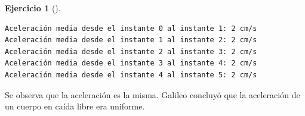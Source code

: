 \documentclass[
  a4paper,
]{scrreport}
\newenvironment{Shaded}{\begin{snugshade}}{\end{snugshade}}
\newcommand{\ControlFlowTok}[1]{\textcolor[rgb]{0.00,0.23,0.31}{\textbf{#1}}}
\newcommand{\FloatTok}[1]{\textcolor[rgb]{0.68,0.00,0.00}{#1}}
\newcommand{\FunctionTok}[1]{\textcolor[rgb]{0.28,0.35,0.67}{#1}}
\newcommand{\KeywordTok}[1]{\textcolor[rgb]{0.00,0.23,0.31}{\textbf{#1}}}
\newcommand{\NormalTok}[1]{\textcolor[rgb]{0.00,0.23,0.31}{#1}}
\newcommand{\OperatorTok}[1]{\textcolor[rgb]{0.37,0.37,0.37}{#1}}
\newcommand{\SpecialCharTok}[1]{\textcolor[rgb]{0.37,0.37,0.37}{#1}}
\newcommand{\StringTok}[1]{\textcolor[rgb]{0.13,0.47,0.30}{#1}}
\theoremstyle{definition}
\newtheorem{exercise}{Ejercicio}[chapter]
\theoremstyle{remark}
\begin{document}
\begin{exercise}[]
\begin{enumerate}
\begin{tcolorbox}
\begin{Shaded}
\end{Shaded}

\begin{verbatim}
Aceleración media desde el instante 0 al instante 1: 2 cm/s
Aceleración media desde el instante 1 al instante 2: 2 cm/s
Aceleración media desde el instante 2 al instante 3: 2 cm/s
Aceleración media desde el instante 3 al instante 4: 2 cm/s
Aceleración media desde el instante 4 al instante 5: 2 cm/s
\end{verbatim}

  Se observa que la aceleración es la misma. Galileo concluyó que la
  aceleración de un cuerpo en caída libre era uniforme.

  \end{tcolorbox}
\end{enumerate}

\end{exercise}
\end{document}
